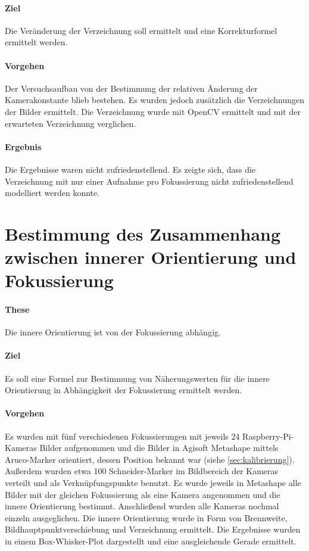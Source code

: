 \documentclass[./00PhotoBox.tex]{subfiles}
\begin{document}
\paragraph{Ziel}
Die Veränderung der Verzeichnung soll ermittelt und eine Korrekturformel ermittelt werden.

\paragraph{Vorgehen}
Der Versuchsaufbau von der Bestimmung der relativen Änderung der Kamerakonstante blieb bestehen. Es wurden jedoch zusätzlich die Verzeichnungen der Bilder ermittelt. Die Verzeichnung wurde mit OpenCV ermittelt und mit der erwarteten Verzeichnung verglichen.

\paragraph{Ergebnis}
Die Ergebnisse waren nicht zufriedenstellend. Es zeigte sich, dass die Verzeichnung mit nur einer Aufnahme pro Fokussierung nicht zufriedenstellend modelliert werden konnte.

\section{Bestimmung des Zusammenhang zwischen innerer Orientierung und Fokussierung}

\paragraph{These}
Die innere Orientierung ist von der Fokussierung abhängig.

\paragraph{Ziel}
Es soll eine Formel zur Bestimmung von Näherungswerten für die innere Orientierung in Abhängigkeit der Fokussierung ermittelt werden.

\paragraph{Vorgehen}
Es wurden mit fünf verschiedenen Fokussierungen mit jeweils 24 Raspberry-Pi-Kameras Bilder aufgenommen und die Bilder in Agisoft Metashape mittels Aruco-Marker orientiert, dessen Position bekannt war (siehe \autoref{sec:kalibrierung}). Außerdem wurden etwa 100 Schneider-Marker im Bildbereich der Kameras verteilt und als Verknüpfungspunkte benutzt. Es wurde jeweils in Metashape alle Bilder mit der gleichen Fokussierung als eine Kamera angenommen und die innere Orientierung bestimmt. Anschließend wurden alle Kameras nochmal einzeln ausgeglichen. Die innere Orientierung wurde in Form von Brennweite, Bildhauptpunktverschiebung und Verzeichnung ermittelt. Die Ergebnisse wurden in einem Box-Whisker-Plot dargestellt und eine ausgleichende Gerade ermittelt.
\end{document}
